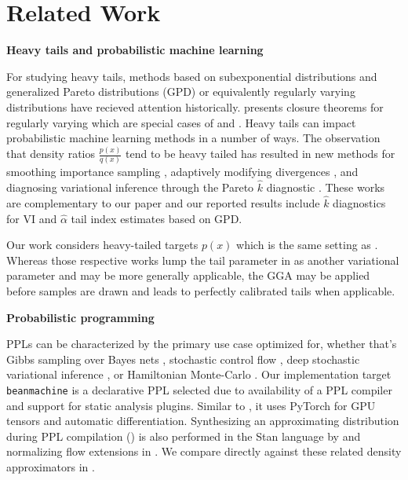 \documentclass[../thesis.tex]{subfiles}
\begin{document}
\section{Related Work}

\textbf{Heavy tails and probabilistic machine learning}

For studying heavy tails, methods based on subexponential distributions
\citep{goldie1998subexponential} and generalized Pareto distributions (GPD) or
equivalently regularly varying distributions \citep{tajvidi2003confidence}
have recieved attention historically. \citet{mikosch} presents closure theorems for regularly varying which are special cases of  and .
Heavy tails can impact probabilistic machine learning methods in a number of ways.
The observation that density ratios $\frac{p(x)}{q(x)}$ tend to be heavy tailed
has resulted in new methods for smoothing importance sampling \citep{vehtari2015pareto},
adaptively modifying divergences \citep{wang2018variational}, and
diagnosing variational inference through the Pareto $\hat{k}$ diagnostic \citep{yao2018yes}.
These works are complementary to our paper and our reported results include $\hat{k}$
diagnostics for VI and $\hat\alpha$ tail index estimates based on GPD.

Our work considers heavy-tailed targets $p(x)$ which is the same setting as
\citet{jaini2020tails,ftvi}. Whereas those respective works
lump the tail parameter in as another variational parameter and may be more generally applicable, the GGA may be applied before samples are drawn and leads to perfectly calibrated tails when applicable.

\textbf{Probabilistic programming}

PPLs can be characterized by the primary use case optimized for, whether that's
Gibbs sampling over Bayes nets \citep{spiegelhalter1996bugs,de2017programming},
stochastic control flow \citep{goodman2012church,wingate2011lightweight},
deep stochastic variational inference \citep{tran2018simple,bingham2019pyro}, or
Hamiltonian Monte-Carlo \citep{carpenter2017stan,xu2020advancedhmc}. Our implementation target
\texttt{beanmachine} \citep{tehrani2020bean} is a declarative PPL selected
due to availability of a PPL compiler and support for static analysis plugins.
Similar to \citet{bingham2019pyro,siddharth2017learning}, it uses PyTorch \citep{paszke2019pytorch} for GPU tensors and automatic differentiation.
Synthesizing an approximating distribution during PPL compilation () is
also performed in the Stan language by \citet{kucukelbir2017automatic} and normalizing
flow extensions in \citet{webb2019aml}. We compare directly against these related density approximators in .
\end{document}
